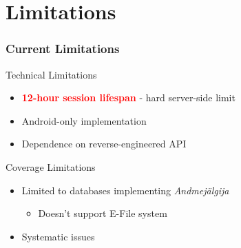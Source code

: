 \documentclass[aspectratio=169,11pt]{beamer}
\begin{document}
\section{Limitations}

\begin{frame}
\frametitle{Current Limitations}
\begin{block}{Technical Limitations}
\begin{itemize}
    \item \textcolor{red}{\textbf{12-hour session lifespan}} - hard server-side limit
    \item Android-only implementation
    \item Dependence on reverse-engineered API
\end{itemize}
\end{block}

\begin{block}{Coverage Limitations}
\begin{itemize}
    \item Limited to databases implementing \textit{Andmejälgija}
    \begin{itemize}
        \item Doesn't support E-File system
    \end{itemize}

\end{itemize}
\end{block}

\begin{itemize}
    \item Systematic issues
\end{itemize}

\end{frame}
\end{document}
